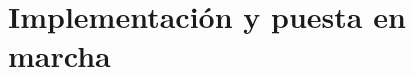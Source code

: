 \documentclass{subfiles}
\begin{document}
  \chapter{Implementación y puesta en marcha}
  \label{chap:5}
\end{document}
